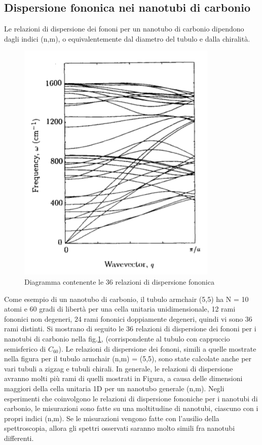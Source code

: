 \documentclass[a4paper,titlepage]{book}
\begin{document}
\subsection{Dispersione fononica nei nanotubi di carbonio}
Le relazioni di dispersione dei fononi per un nanotubo di carbonio dipendono dagli indici (n,m), o equivalentemente dal diametro del tubulo e dalla chiralità.
\begin{figure}[h!] 
	\centering
	\includegraphics[width=0.55\columnwidth]{phononnanotubes.png}
	\caption{ 	\label{boom}
		Diagramma contenente le 36 relazioni di dispersione fononica 
	}
\end{figure}
Come esempio di un nanotubo di carbonio, il tubulo armchair (5,5) ha N = 10 atomi e 60 gradi di libertà per una cella unitaria unidimensionale, 12 rami fononici non degeneri, 24 rami fononici doppiamente degeneri, quindi vi sono 36 rami distinti.
Si mostrano di seguito le 36 relazioni di dispersione dei fononi per i nanotubi di carbonio nella fig.\ref{boom}, (corrispondente al tubulo con cappuccio semisferico di $C_{60}$).
Le relazioni di dispersione dei fononi, simili a quelle mostrate nella figura per il tubulo armchair (n,m) = (5,5), sono state calcolate anche per vari tubuli a zigzag e tubuli chirali. In generale, le relazioni di dispersione avranno molti più rami di quelli mostrati in Figura, a causa delle dimensioni maggiori della cella unitaria 1D per un nanotubo generale (n,m). Negli esperimenti che coinvolgono le relazioni di dispersione fononiche per i nanotubi di carbonio, le misurazioni sono fatte su una moltitudine di nanotubi, ciascuno con i propri indici (n,m). Se le misurazioni vengono fatte con l'ausilio della spettroscopia, allora gli spettri osservati saranno molto simili fra nanotubi differenti.
\end{document}
